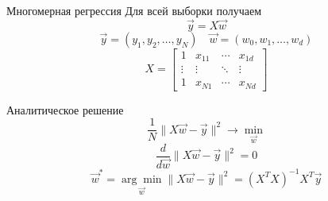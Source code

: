 \documentclass[aspectratio=169]{beamer}
\begin{document}
\begin{frame}{Многомерная регрессия}
    Для всей выборки получаем
    {\Large
        \[ \vec{y} = X \vec{w} \]
        \[ \vec{y} = (y_1, y_2, \dots, y_N) \quad \vec{w} = (w_0, w_1, \dots, w_d) \]
        \[
            X = \begin{bmatrix}
                1 & x_{11} & \cdots & x_{1d} \\
                \vdots & \vdots & \ddots & \vdots \\
                1 & x_{N1} & \cdots & x_{Nd}
            \end{bmatrix}
        \]
    }
\end{frame}

\begin{frame}{Аналитическое решение}
    \LARGE
    \[ \frac{1}{N} \| X \vec{w} - \vec{y} \|^2 \rightarrow \min_{\vec{w}} \]
    \pause
    \[ \frac{d}{d \vec{w}} \| X \vec{w} - \vec{y} \|^2 = 0 \]
    \pause
    \[
        \vec{w}^* = \underset{\vec{w}}{\arg\min} \| X \vec{w} - \vec{y} \|^2
        = {(X^T X)}^{-1} X^T \vec{y}
    \]
\end{frame}
\end{document}
